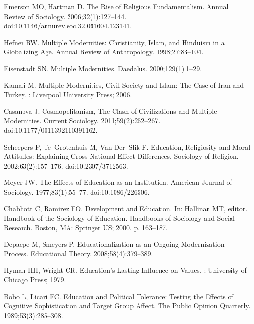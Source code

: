 \documentclass[10pt,letterpaper]{article}
\begin{document}
\begin{thebibliography}{10}
Emerson MO, Hartman D.
\newblock The {{Rise}} of {{Religious Fundamentalism}}.
\newblock Annual Review of Sociology. 2006;32(1):127--144.
\newblock doi:{10.1146/annurev.soc.32.061604.123141}.

Hefner RW.
\newblock Multiple {{Modernities}}: {{Christianity}}, {{Islam}}, and
  {{Hinduism}} in a {{Globalizing Age}}.
\newblock Annual Review of Anthropology. 1998;27:83--104.

Eisenstadt SN.
\newblock Multiple {{Modernities}}.
\newblock Daedalus. 2000;129(1):1--29.

Kamali M.
\newblock Multiple {{Modernities}}, {{Civil Society}} and {{Islam}}: The
  {{Case}} of {{Iran}} and {{Turkey}}.
: {Liverpool University Press}; 2006.

Casanova J.
\newblock Cosmopolitanism, {{The Clash}} of {{Civilizations}} and {{Multiple
  Modernities}}.
\newblock Current Sociology. 2011;59(2):252--267.
\newblock doi:{10.1177/0011392110391162}.

Scheepers P, Te~Grotenhuis M, Van Der~Slik F.
\newblock Education, {{Religiosity}} and {{Moral Attitudes}}: {{Explaining
  Cross}}-{{National Effect Differences}}.
\newblock Sociology of Religion. 2002;63(2):157--176.
\newblock doi:{10.2307/3712563}.

Meyer JW.
\newblock The {{Effects}} of {{Education}} as an {{Institution}}.
\newblock American Journal of Sociology. 1977;83(1):55--77.
\newblock doi:{10.1086/226506}.

Chabbott C, Ramirez FO.
\newblock Development and {{Education}}.
\newblock In: Hallinan MT, editor. Handbook of the {{Sociology}} of
  {{Education}}. Handbooks of {{Sociology}} and {{Social Research}}. {Boston,
  MA}: {Springer US}; 2000. p. 163--187.

Depaepe M, Smeyers P.
\newblock Educationalization as an {{Ongoing Modernization Process}}.
\newblock Educational Theory. 2008;58(4):379--389.

Hyman HH, Wright CR.
\newblock Education's {{Lasting Influence}} on {{Values}}.
: {University of Chicago Press}; 1979.

Bobo L, Licari FC.
\newblock Education and {{Political Tolerance}}: {{Testing}} the {{Effects}} of
  {{Cognitive Sophistication}} and {{Target Group Affect}}.
\newblock The Public Opinion Quarterly. 1989;53(3):285--308.


\end{thebibliography}
\end{document}
